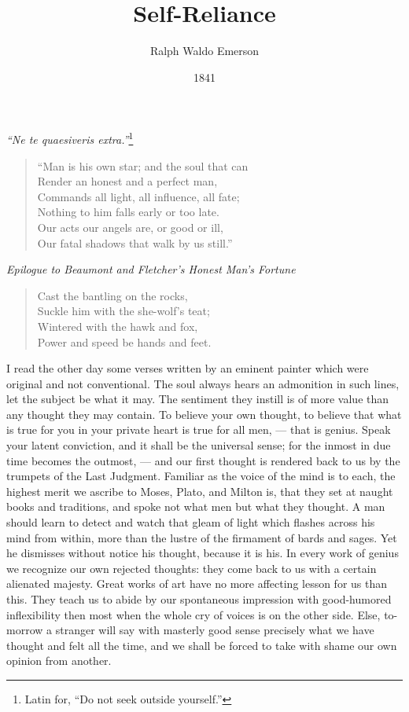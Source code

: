 \documentclass{article}
\title{Self-Reliance}
\author{Ralph Waldo Emerson}
\date{1841}
\begin{document}
\pagestyle{fancy}
\maketitle

{\it ``Ne te quaesiveris extra.''}\footnote{Latin for, ``Do not seek outside yourself.''}

\begin{verse}
``Man is his own star; and the soul that can\\
Render an honest and a perfect man,\\
Commands all light, all influence, all fate;\\
Nothing to him falls early or too late.\\
Our acts our angels are, or good or ill,\\
Our fatal shadows that walk by us still.''\\
\end{verse}

{\it Epilogue to Beaumont and Fletcher's Honest Man's Fortune}


\begin{verse}
Cast the bantling on the rocks,\\
Suckle him with the she-wolf's teat;\\
Wintered with the hawk and fox,\\
Power and speed be hands and feet.
\end{verse}

I read the other day some verses written by an eminent painter which were
original and not conventional. The soul always hears an admonition in such
lines, let the subject be what it may. The sentiment they instill is of more
value than any thought they may contain. To believe your own thought, to
believe that what is true for you in your private heart is true for all
men, --- that is genius. Speak your latent conviction, and it shall be the
universal sense; for the inmost in due time becomes the outmost, --- and our
first thought is rendered back to us by the trumpets of the Last Judgment.
Familiar as the voice of the mind is to each, the highest merit we ascribe
to Moses, Plato, and Milton is, that they set at naught books and
traditions, and spoke not what men but what they thought. A man should learn
to detect and watch that gleam of light which flashes across his mind from
within, more than the lustre of the firmament of bards and sages. Yet he
dismisses without notice his thought, because it is his. In every work of
genius we recognize our own rejected thoughts: they come back to us with a
certain alienated majesty. Great works of art have no more affecting lesson
for us than this. They teach us to abide by our spontaneous impression with
good-humored inflexibility then most when the whole cry of voices is on the
other side. Else, to-morrow a stranger will say with masterly good sense
precisely what we have thought and felt all the time, and we shall be forced
to take with shame our own opinion from another.
\end{document}

